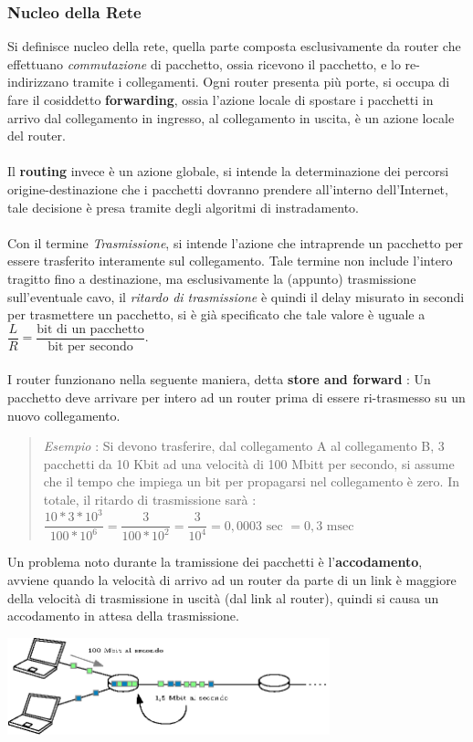 \documentclass[12pt, letterpaper]{article}
\newcommand{\acc}{\\\hphantom{}\\}
\begin{document}
\subsubsection{Nucleo della Rete}
Si definisce nucleo della rete, quella parte composta esclusivamente da router  che effettuano \textit{commutazione} di pacchetto, ossia
ricevono il pacchetto, e lo re-indirizzano tramite i collegamenti. Ogni router presenta più porte, si occupa di fare il
cosiddetto \textbf{forwarding}, ossia l'azione locale di spostare i pacchetti in arrivo dal collegamento in ingresso, al collegamento
in uscita, è un azione locale del router.\acc
Il \textbf{routing} invece è un azione globale, si intende la determinazione dei percorsi origine-destinazione che i pacchetti
dovranno prendere all'interno dell'Internet, tale decisione è presa tramite degli algoritmi di instradamento.\acc
Con il termine \textit{Trasmissione}, si intende l'azione che intraprende un pacchetto per essere trasferito interamente
sul collegamento. Tale termine non include l'intero tragitto fino a destinazione, ma esclusivamente la (appunto) trasmissione sull'eventuale
cavo, il \textit{ritardo di trasmissione} è quindi il delay misurato in secondi per trasmettere un pacchetto, si è già specificato che tale
valore è uguale a $\dfrac{L}{R}=\dfrac{\text{bit di un pacchetto}}{\text{bit per secondo}}$.\acc
I router funzionano nella seguente maniera, detta \textbf{store and forward} : Un pacchetto deve arrivare per intero ad un router
prima di essere ri-trasmesso su un nuovo collegamento.\begin{quote}
    \color{gray} \textit{Esempio} : Si devono trasferire, dal collegamento A al collegamento B, 3 pacchetti da 10 Kbit ad una
    velocità di 100 Mbitt per secondo, si assume che il  tempo che impiega un bit per propagarsi nel collegamento è zero.
    In totale, il ritardo di trasmissione sarà : $\dfrac{10*3*10^3}{100*10^6}=\dfrac{3}{100*10^2}=\dfrac{3}{10^4}=0,0003\text{ sec }=0,3\text{ msec }$
    \color{black}
\end{quote}
Un problema noto durante la tramissione dei pacchetti è l'\textbf{accodamento}, avviene quando la velocità di arrivo ad
un router da parte di un link è maggiore della velocità di trasmissione in uscità (dal link al router), quindi si causa un
accodamento in attesa della trasmissione.\begin{center}
    \includegraphics[width=0.7\textwidth ]{images/accodamento.ip.eps}
\end{center}
\end{document}
